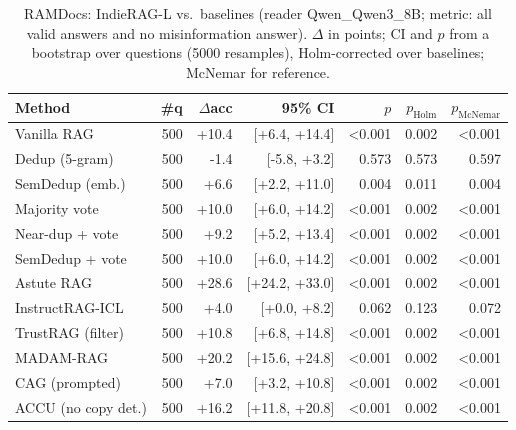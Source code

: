 \begin{table}[tbp]
\centering
\small
\caption{RAMDocs: IndieRAG-L vs.\ baselines (reader Qwen\_Qwen3\_8B; metric: all valid answers and no misinformation answer). $\Delta$ in points; CI and $p$ from a bootstrap over questions (5000 resamples), Holm-corrected over baselines; McNemar for reference.}
\label{tab:sig:ramdocs:Qwen_Qwen3_8B}
\setlength{\tabcolsep}{4pt}
\begin{tabular}{lrrrrrr}
\toprule
Method & \#q & $\Delta$acc & 95\% CI & $p$ & $p_{\text{Holm}}$ & $p_{\text{McNemar}}$ \\
\midrule
Vanilla RAG & 500 & +10.4 & [+6.4, +14.4] & <0.001 & 0.002 & <0.001 \\
Dedup (5-gram) & 500 & -1.4 & [-5.8, +3.2] & 0.573 & 0.573 & 0.597 \\
SemDedup (emb.) & 500 & +6.6 & [+2.2, +11.0] & 0.004 & 0.011 & 0.004 \\
Majority vote & 500 & +10.0 & [+6.0, +14.2] & <0.001 & 0.002 & <0.001 \\
Near-dup + vote & 500 & +9.2 & [+5.2, +13.4] & <0.001 & 0.002 & <0.001 \\
SemDedup + vote & 500 & +10.0 & [+6.0, +14.2] & <0.001 & 0.002 & <0.001 \\
Astute RAG & 500 & +28.6 & [+24.2, +33.0] & <0.001 & 0.002 & <0.001 \\
InstructRAG-ICL & 500 & +4.0 & [+0.0, +8.2] & 0.062 & 0.123 & 0.072 \\
TrustRAG (filter) & 500 & +10.8 & [+6.8, +14.8] & <0.001 & 0.002 & <0.001 \\
MADAM-RAG & 500 & +20.2 & [+15.6, +24.8] & <0.001 & 0.002 & <0.001 \\
CAG (prompted) & 500 & +7.0 & [+3.2, +10.8] & <0.001 & 0.002 & <0.001 \\
ACCU (no copy det.) & 500 & +16.2 & [+11.8, +20.8] & <0.001 & 0.002 & <0.001 \\
\bottomrule
\end{tabular}
\end{table}
